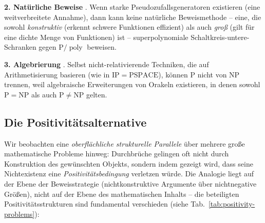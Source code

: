 \documentclass[aps,prd,twocolumn,superscriptaddress,nofootinbib]{revtex4-2}
\theoremstyle{definition}
\theoremstyle{remark}
\DeclareMathOperator{\poly}{poly}
\newcommand{\NP}{\mathrm{NP}}
\newcommand{\PP}{\mathrm{P}}
\begin{document}
\textbf{2. Natürliche Beweise} \cite{RazborovRudich1997}. Wenn starke Pseudozufallsgeneratoren existieren (eine weitverbreitete Annahme), dann kann keine \glqq natürliche\grqq{} Beweismethode -- eine, die sowohl \textit{konstruktiv} (erkennt schwere Funktionen effizient) als auch \textit{groß} (gilt für eine dichte Menge von Funktionen) ist -- superpolynomiale Schaltkreis-untere-Schranken gegen $\PP/\poly$ beweisen.

\textbf{3. Algebrierung} \cite{AaronsonWigderson2009}. Selbst nicht-relativierende Techniken, die auf Arithmetisierung basieren (wie in $\mathrm{IP} = \mathrm{PSPACE}$), können $\PP$ nicht von $\NP$ trennen, weil algebraische Erweiterungen von Orakeln existieren, in denen sowohl $\PP = \NP$ als auch $\PP \neq \NP$ gelten.

\subsection{Die Positivitätsalternative}

Wir beobachten eine \textit{oberflächliche strukturelle Parallele} über mehrere große mathematische Probleme hinweg: Durchbrüche gelingen oft nicht durch Konstruktion des gewünschten Objekts, sondern indem gezeigt wird, dass seine Nichtexistenz eine \textit{Positivitätsbedingung} verletzen würde. Die Analogie liegt auf der Ebene der Beweisstrategie (nichtkonstruktive Argumente über nichtnegative Größen), nicht auf der Ebene des mathematischen Inhalts -- die beteiligten Positivitätsstrukturen sind fundamental verschieden (siehe Tab.~\ref{tab:positivity-problems}):

\begin{table}[htbp]
\caption{Positive Strukturen und Beweisstrategien im Vergleich.}
\label{tab:positivity-problems}
\centering
{}
\end{table}
\end{document}
